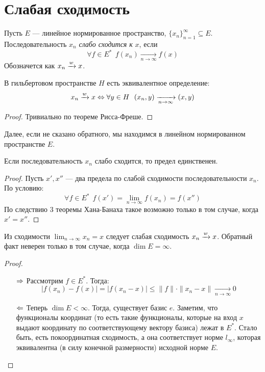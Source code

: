 \setcounter{section}{6}
\section{Слабая сходимость}

\begin{definition}
	Пусть $E$ --- линейное нормированное пространство, $\{x_n\}_{n = 1}^\infty \subseteq E$. Последовательность $x_n$ \textit{слабо сходится к} $x$, если
	\[
		\forall f \in E^*\ \ f(x_n) \xrightarrow[n \to \infty]{} f(x)
	\]
	Обозначется как $x_n \xrightarrow{w} x$.
\end{definition}

\begin{proposition}
	В гильбертовом пространстве $H$ есть эквивалентное определение:
	\[
	x_n \xrightarrow{w} x \Leftrightarrow \forall y \in H\ \ (x_n, y) \xrightarrow[n \to \infty]{} (x, y)
	\]
\end{proposition}

\begin{proof}
	Тривиально по теореме Рисса-Фреше.
\end{proof}

\begin{note}
	Далее, если не сказано обратного, мы находимся в линейном нормированном пространстве $E$.
\end{note}

\begin{proposition}
	Если последовательность $x_n$ слабо сходится, то предел единственен.
\end{proposition}

\begin{proof}
	Пусть $x', x''$ --- два предела по слабой сходимости последовательности $x_n$. По условию:
	\[
		\forall f \in E^*\ \ f(x') = \lim_{n \to \infty} f(x_n) = f(x'')
	\]
	По следствию 3 теоремы Хана-Банаха такое возможно только в том случае, когда $x' = x''$.
\end{proof}

\begin{proposition}
	Из сходимости $\lim_{n \to \infty} x_n = x$ следует слабая сходимость $x_n \xrightarrow{w} x$. Обратный факт неверен только в том случае, когда $\dim E = \infty$.
\end{proposition}

\begin{proof}~
	\begin{itemize}
		\item[$\Rightarrow$] Рассмотрим $f \in E^*$. Тогда:
		\[
			|f(x_n) - f(x)| = |f(x_n - x)| \le \|f\| \cdot \|x_n - x\| \xrightarrow[n \to \infty]{} 0
		\]
		
		\item[$\Leftarrow$] Теперь $\dim E < \infty$. Тогда, существует базис $e$. Заметим, что функционалы координат (то есть такие функционалы, которые на вход $x$ выдают координату по соответствующему вектору базиса) лежат в $E^*$. Стало быть, есть покоординатная сходимость, а она соответствует норме $l_\infty$, которая эквивалентна (в силу конечной размерности) исходной норме $E$.
	\end{itemize}
\end{proof}

